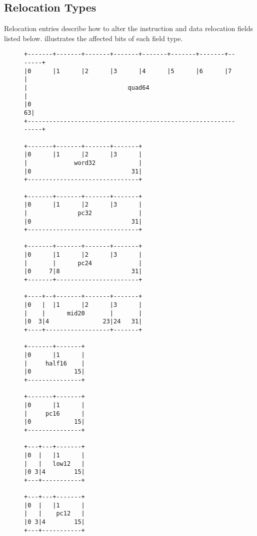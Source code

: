 \documentclass[english,11pt,twoside,toc=bib,toc=idx]{scrreprt}
\newif\ifSkipTikZ
\begin{document}
\subsection{Relocation Types}
Relocation entries describe how to alter the instruction and data
relocation fields listed below.   illustrates the
affected bits of each field type.

\begin{figure}
  \centering
  \ifSkipTikZ
\begin{verbatim}
+-------+-------+-------+-------+-------+-------+-------+-------+
|0      |1      |2      |3      |4      |5      |6      |7      |
|                            quad64                             |
|0                                                            63|
+---------------------------------------------------------------+

+-------+-------+-------+-------+
|0      |1      |2      |3      |
|             word32            |
|0                            31|
+-------------------------------+

+-------+-------+-------+-------+
|0      |1      |2      |3      |
|              pc32             |
|0                            31|
+-------------------------------+

+-------+-------+-------+-------+
|0      |1      |2      |3      |
|       |      pc24             |
|0     7|8                    31|
+-------+-----------------------+

+----+--+-------+-------+-------+
|0   |  |1      |2      |3      |
|    |      mid20       |       |
|0  3|4               23|24   31|
+----+------------------+-------+

+-------+-------+
|0      |1      |
|     half16    |
|0            15|
+---------------+

+-------+-------+
|0      |1      |
|     pc16      |
|0            15|
+---------------+

+---+---+-------+
|0  |   |1      |
|   |   low12   |
|0 3|4        15|
+---+-----------+

+---+---+-------+
|0  |   |1      |
|   |    pc12   |
|0 3|4        15|
+---+-----------+


\end{verbatim}
\end{figure}
\end{document}
